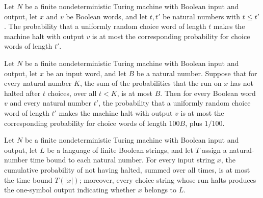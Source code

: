 \begin{theorem}
\label{Turing.FinNDTM.haltProb_mono}
\leanok
{}
Let $N$ be a finite nondeterministic Turing machine with Boolean input and output, let
$x$ and $v$ be Boolean words, and let $t,t'$ be natural numbers with $t\le t'$. The
probability that a uniformly random choice word of length $t$ makes the machine halt
with output $v$ is at most the corresponding probability for choice words of length
$t'$.
\end{theorem}

\begin{theorem}
\label{Turing.FinNDTM.haltProb_le_truncate}
\leanok
{}
Let $N$ be a finite nondeterministic Turing machine with Boolean input and output, let
$x$ be an input word, and let $B$ be a natural number. Suppose that for every natural
number $K$, the sum of the probabilities that the run on $x$ has not halted after $t$
choices, over all $t<K$, is at most $B$. Then for every Boolean word $v$ and every
natural number $t'$, the probability that a uniformly random choice word of length $t'$
makes the machine halt with output $v$ is at most the corresponding probability for
choice words of length $100B$, plus $1/100$.
\end{theorem}

\begin{definition}
\label{Turing.FinNDTM.ZDecidesInTime}
\leanok
{}
Let $N$ be a finite nondeterministic Turing machine with Boolean input and output, let
$L$ be a language of finite Boolean strings, and let $T$ assign a natural-number time
bound to each natural number. For every input string $x$, the cumulative probability of
not having halted, summed over all times, is at most the time bound $T(|x|)$; moreover,
every choice string whose run halts produces the one-symbol output indicating whether
$x$ belongs to $L$.
\end{definition}

